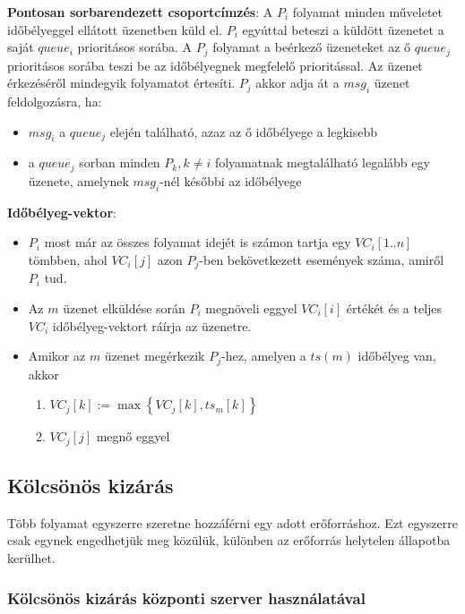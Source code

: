 \documentclass[12pt]{article}
\begin{document}
	\noindent \textbf{Pontosan sorbarendezett csoportcímzés}: A $P_{i}$ folyamat minden műveletet időbélyeggel ellátott
	üzenetben küld el. $P_{i}$ egyúttal beteszi a küldött üzenetet a saját $queue_{i}$ prioritásos sorába. A $P_{j}$
	folyamat a beérkező üzeneteket az ő $queue_{j}$ prioritásos sorába teszi be az időbélyegnek megfelelő prioritással.
	Az üzenet érkezéséről mindegyik folyamatot értesíti.
	$P_{j}$ akkor adja át a $msg_{i}$ üzenet feldolgozásra, ha:
	\begin{itemize}
		\item	$msg_{i}$ a $queue_{j}$ elején található, azaz az ő időbélyege a legkisebb
		\item	a $queue_{j}$ sorban minden $P_{k}, k \not = i$ folyamatnak megtalálható legalább egy üzenete, amelynek
		$msg_{i}$-nél későbbi az időbélyege

	\end{itemize}
\newpage	
	\noindent \textbf{Időbélyeg-vektor}:
	\begin{itemize}
		\item	$P_{i}$ most már az összes folyamat idejét is számon tartja egy $VC_{i}[1..n]$ tömbben, ahol
		$VC_{i}[j]$ azon $P_{j}$-ben bekövetkezett események száma, amiről $P_{i}$ tud.
		
		\item	Az $m$ üzenet elküldése során $P_{i}$ megnöveli eggyel $VC_{i}[i]$ értékét és a teljes $VC_{i}$
		időbélyeg-vektort ráírja az üzenetre.
		
		\item	Amikor az $m$ üzenet megérkezik $P_{j}$-hez, amelyen a $ts(m)$ időbélyeg van, akkor
		\begin{enumerate}
			\item	$VC_{j}[k] := \max \left\{VC_{j}[k], ts_{m}[k]\right\}$
			\item	$VC_{j}[j]$ megnő eggyel
		\end{enumerate}
	\end{itemize}
	
	\subsection{Kölcsönös kizárás}
	
	Több folyamat egyszerre szeretne hozzáférni egy adott erőforráshoz. Ezt egyszerre csak egynek engedhetjük meg
	közülük, különben az erőforrás helytelen állapotba kerülhet.
	
	\subsubsection{Kölcsönös kizárás központi szerver használatával}
	
\end{document}
